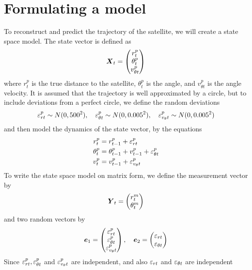 \section*{Formulating a model}
To reconstruct and predict the trajectory of the satellite, we will create a state space model. The state vector is defined as
\begin{equation*}
    \boldsymbol{X}_t = \begin{pmatrix}
        r^p_t \\
        \theta^p_t \\
        v^p_{\theta t}
    \end{pmatrix}
\end{equation*}
where $r^p_{t}$ is the true distance to the satellite, $\theta^p_t$ is the angle, and $v^p_{\theta t}$ is the angle velocity. It is assumed that the trajectory is well approximated by a circle, but to include deviations from a perfect circle, we define the random deviations
\begin{equation*}
    \varepsilon^p_{rt} \sim N(0,500^2), \quad \varepsilon^p_{\theta t}\sim N(0,0.005^2), \quad \varepsilon^p_{v_\theta t} \sim N(0, 0.005^2)
\end{equation*}
and then model the dynamics of the state vector, by the equations
\begin{align*}
    r^p_t &= r^p_{t-1} + \varepsilon^p_{rt} \\
    \theta^p_t &= \theta^p_{t-1} + v^p_{t-1} + \varepsilon^p_{\theta t} \\
    v^p_t &= v^p_{t-1} + \varepsilon^p_{v_\theta t}
\end{align*}
To write the state space model on matrix form, we define the measurement vector by
\begin{equation*}
    \boldsymbol{Y}_t = \begin{pmatrix}
        r^m_t \\
        \theta^m_t
    \end{pmatrix}
\end{equation*}
and two random vectors by
\begin{equation*}
    \boldsymbol{e}_1 = \begin{pmatrix}
        \varepsilon^p_{rt} \\
        \varepsilon^p_{\theta t} \\
        \varepsilon^p_{v_\theta t}
    \end{pmatrix}, \quad \boldsymbol{e}_2 = \begin{pmatrix}
        \varepsilon_{rt} \\
        \varepsilon_{\theta t}
    \end{pmatrix}
\end{equation*}
Since $\varepsilon^p_{rt},\varepsilon^p_{\theta t}$ and $\varepsilon^p_{v_\theta t}$ are independent, and also $\varepsilon_{rt}$ and $\varepsilon_{\theta t}$ are independent
